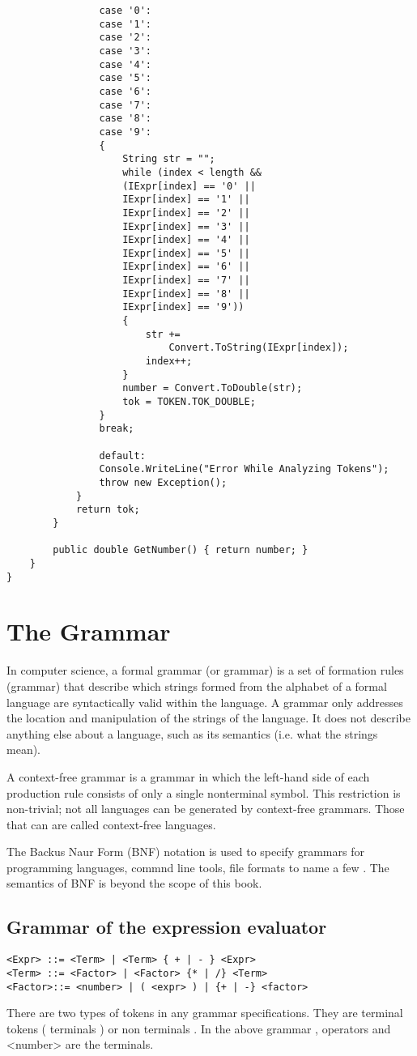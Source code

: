 \begin{lstlisting}
				case '0':
				case '1':
				case '2':
				case '3':
				case '4':
				case '5':
				case '6':
				case '7':
				case '8':
				case '9':
				{
					String str = "";
					while (index < length &&
					(IExpr[index] == '0' ||
					IExpr[index] == '1' ||
					IExpr[index] == '2' ||
					IExpr[index] == '3' ||
					IExpr[index] == '4' ||
					IExpr[index] == '5' ||
					IExpr[index] == '6' ||
					IExpr[index] == '7' ||
					IExpr[index] == '8' ||
					IExpr[index] == '9'))
					{
						str += 
							Convert.ToString(IExpr[index]);
						index++;
					}
					number = Convert.ToDouble(str);
					tok = TOKEN.TOK_DOUBLE;
				}
				break;
				
				default:
				Console.WriteLine("Error While Analyzing Tokens");
				throw new Exception();
			}
			return tok;
		}
		
		public double GetNumber() { return number; }
	}
}
\end{lstlisting}

\section{The Grammar}
In computer science, a formal grammar (or grammar) is a set of formation rules (grammar) that describe which strings formed from the alphabet of a formal language are syntactically valid within the language. A grammar only addresses the location and manipulation of the strings of the language. It does not describe anything else about a language, such as its semantics (i.e. what the strings mean).

A context-free grammar is a grammar in which the left-hand side of each production rule consists of only a single nonterminal symbol. This restriction is non-trivial; not all languages can be generated by context-free grammars. Those that can are called context-free languages.

The Backus Naur Form (BNF) notation is used to specify grammars for programming languages, commnd line tools, file formats to name a few . The semantics of BNF is beyond the scope of this book.

\subsection{Grammar of the expression evaluator}
\lstset{style=csharp}
\begin{lstlisting}
<Expr> ::= <Term> | <Term> { + | - } <Expr>
<Term> ::= <Factor> | <Factor> {* | /} <Term>
<Factor>::= <number> | ( <expr> ) | {+ | -} <factor>
\end{lstlisting}
There are two types of tokens in any grammar specifications. They are terminal tokens ( terminals ) or non terminals . In the above grammar , operators and <number> are the terminals.

